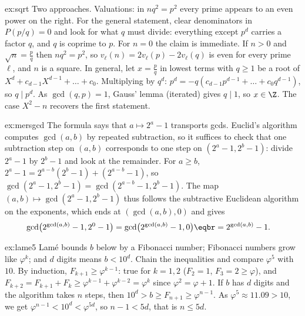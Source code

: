 \begin{solution}{ex:sqrt}
\idea Two approaches. Valuations: in $nq^2=p^2$ every prime appears to an even power on the right. For the general statement, clear denominators in $P(p/q)=0$ and look for what $q$ must divide: everything except $p^d$ carries a factor $q$, and $q$ is coprime to $p$.
\writeup For $n=0$ the claim is immediate. If $n>0$ and $\sqrt n=\frac pq$ then $nq^2=p^2$, so $v_\ell(n)=2v_\ell(p)-2v_\ell(q)$ is even for every prime $\ell$, and $n$ is a square. In general, let $x=\frac pq$ in lowest terms with $q\ge1$ be a root of $X^d+c_{d-1}X^{d-1}+\dots+c_0$. Multiplying by $q^d$: $p^d=-q\left(c_{d-1}p^{d-1}+\dots+c_0q^{d-1}\right)$, so $q\mid p^d$. As $\gcd(q,p)=1$, Gauss' lemma (iterated) gives $q\mid1$, so $x\in\Z$. The case $X^2-n$ recovers the first statement.
\end{solution}

\begin{solution}{ex:mersgcd}
\idea The formula says that $a\mapsto2^a-1$ transports gcds. Euclid's algorithm computes $\gcd(a,b)$ by repeated subtraction, so it suffices to check that one subtraction step on $(a,b)$ corresponds to one step on $(2^a-1,2^b-1)$: divide $2^a-1$ by $2^b-1$ and look at the remainder.
\writeup For $a\ge b$, $2^a-1=2^{a-b}\left(2^b-1\right)+\left(2^{a-b}-1\right)$, so $\gcd(2^a-1,2^b-1)=\gcd(2^{a-b}-1,2^b-1)$. The map $(a,b)\mapsto\gcd(2^a-1,2^b-1)$ thus follows the subtractive Euclidean algorithm on the exponents, which ends at $(\gcd(a,b),0)$ and gives
\[\begin{aligned}\gcd\bigl(2^{\gcd(a,b)}-1,2^0-1\bigr)&=\gcd\bigl(2^{\gcd(a,b)}-1,0\bigr)\eqbr=2^{\gcd(a,b)}-1.\end{aligned}\]
\end{solution}

\begin{solution}{ex:lame5}
\idea Lam\'e bounds $b$ below by a Fibonacci number; Fibonacci numbers grow like $\varphi^k$; and $d$ digits means $b<10^d$. Chain the inequalities and compare $\varphi^5$ with $10$.
\writeup By induction, $F_{k+1}\ge\varphi^{k-1}$: true for $k=1,2$ ($F_2=1$, $F_3=2\ge\varphi$), and $F_{k+2}=F_{k+1}+F_k\ge\varphi^{k-1}+\varphi^{k-2}=\varphi^k$ since $\varphi^2=\varphi+1$. If $b$ has $d$ digits and the algorithm takes $n$ steps, then $10^d>b\ge F_{n+1}\ge\varphi^{n-1}$. As $\varphi^5\approx11.09>10$, we get $\varphi^{n-1}<10^d<\varphi^{5d}$, so $n-1<5d$, that is $n\le5d$.
\end{solution}

